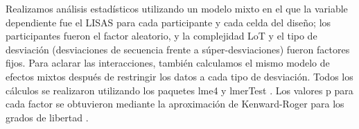 Realizamos análisis estadísticos utilizando un modelo mixto en el que la variable dependiente fue el LISAS para cada participante y cada celda del diseño; los participantes fueron el factor aleatorio, y la complejidad LoT y el tipo de desviación (desviaciones de secuencia frente a súper-desviaciones) fueron factores fijos. Para aclarar las interacciones, también calculamos el mismo modelo de efectos mixtos después de restringir los datos a cada tipo de desviación. Todos los cálculos se realizaron utilizando los paquetes lme4 \cite{f137} y lmerTest \cite{f138}. Los valores p para cada factor se obtuvieron mediante la aproximación de Kenward-Roger para los grados de libertad \cite{f139}.


